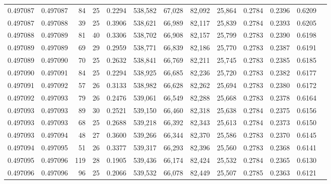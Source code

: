 \begin{tabular}{rrrrrrrrrrrrr}
0.497087 & 0.497087 &  84 &  25 &                                     0.2294 & 538,582 &  67,028 &  82,092 &  25,864 & 0.2784 & 0.2396 & 0.6209 \\
0.497087 & 0.497088 &  39 &  25 &                                     0.3906 & 538,621 &  66,989 &  82,117 &  25,839 & 0.2784 & 0.2393 & 0.6205 \\
0.497088 & 0.497089 &  81 &  40 &                                     0.3306 & 538,702 &  66,908 &  82,157 &  25,799 & 0.2783 & 0.2390 & 0.6198 \\
0.497089 & 0.497089 &  69 &  29 &                                     0.2959 & 538,771 &  66,839 &  82,186 &  25,770 & 0.2783 & 0.2387 & 0.6191 \\
0.497089 & 0.497090 &  70 &  25 &                                     0.2632 & 538,841 &  66,769 &  82,211 &  25,745 & 0.2783 & 0.2385 & 0.6185 \\
0.497090 & 0.497091 &  84 &  25 &                                     0.2294 & 538,925 &  66,685 &  82,236 &  25,720 & 0.2783 & 0.2382 & 0.6177 \\
0.497091 & 0.497092 &  57 &  26 &                                     0.3133 & 538,982 &  66,628 &  82,262 &  25,694 & 0.2783 & 0.2380 & 0.6172 \\
0.497092 & 0.497093 &  79 &  26 &                                     0.2476 & 539,061 &  66,549 &  82,288 &  25,668 & 0.2783 & 0.2378 & 0.6164 \\
0.497093 & 0.497093 &  89 &  30 &                                     0.2521 & 539,150 &  66,460 &  82,318 &  25,638 & 0.2784 & 0.2375 & 0.6156 \\
0.497093 & 0.497093 &  68 &  25 &                                     0.2688 & 539,218 &  66,392 &  82,343 &  25,613 & 0.2784 & 0.2373 & 0.6150 \\
0.497093 & 0.497094 &  48 &  27 &                                     0.3600 & 539,266 &  66,344 &  82,370 &  25,586 & 0.2783 & 0.2370 & 0.6145 \\
0.497094 & 0.497095 &  51 &  26 &                                     0.3377 & 539,317 &  66,293 &  82,396 &  25,560 & 0.2783 & 0.2368 & 0.6141 \\
0.497095 & 0.497096 & 119 &  28 &                                     0.1905 & 539,436 &  66,174 &  82,424 &  25,532 & 0.2784 & 0.2365 & 0.6130 \\
0.497096 & 0.497096 &  96 &  25 &                                     0.2066 & 539,532 &  66,078 &  82,449 &  25,507 & 0.2785 & 0.2363 & 0.6121 \\

\end{tabular}
